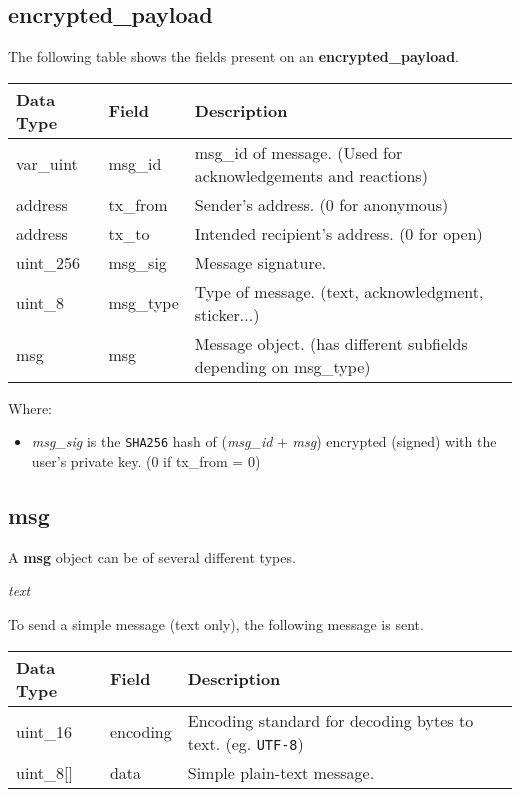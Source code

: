 \documentclass{article}
\begin{document}
\subsection{encrypted\_payload}
The following table shows the fields present on an \textbf{encrypted\_payload}.
\begin{table}[H]
\centering
\begin{tabular}{|p{1.3cm}|p{2.5cm}|p{5.5cm}|}
\hline
\rowcolor{tblgrey}
Data Type   & Field & Description\\ \hline
var\_uint   & msg\_id     & msg\_id of message. (Used for acknowledgements and reactions)\\ \hline
address     & tx\_from    & Sender's address. (0 for anonymous)      \\ \hline
address     & tx\_to      & Intended recipient's address. (0 for open)      \\ \hline
uint\_256   & msg\_sig    & Message signature.                             \\ \hline
uint\_8     & msg\_type   & Type of message. (text, acknowledgment, sticker...)          \\ \hline
msg         & msg         & Message object. (has different subfields depending on msg\_type) \\ \hline
\end{tabular}
\end{table}
Where:
\begin{itemize}
    \item \textit{msg\_sig} is the \texttt{SHA256} hash of (\textit{msg\_id} + \textit{msg}) encrypted (signed) with the user's private key. (0 if tx\_from = 0)
\end{itemize}

\subsection{msg}
A \textbf{msg} object can be of several different types.

\begin{center}
    \large \textit{text}
\end{center}
To send a simple message (text only), the following message is sent.
\begin{table}[H]
\centering
\begin{tabular}{|p{1.3cm}|p{2.5cm}|p{6cm}|}
\hline
\rowcolor{tblgrey} 
Data Type       & Field           & Description                                               \\ \hline
uint\_16        & encoding        & Encoding standard for decoding bytes to text. (eg. \texttt{UTF-8}) \\ \hline
uint\_8[\hspace{0.05cm}] & data            & Simple plain-text message.                                \\ \hline
\end{tabular}
\end{table}
\end{document}

